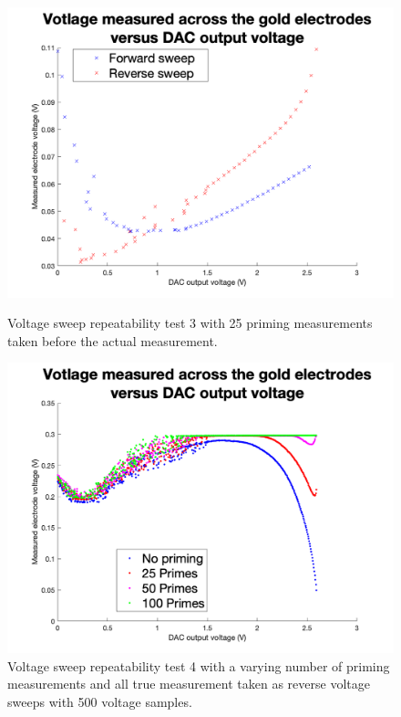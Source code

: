 \begin{figure}[ht]
    \begin{minipage}{0.5\textwidth}
        \centering
        \includegraphics[width=\textwidth]{Figures/Testing/Aus5}
        \caption{Voltage sweep repeatability test 3 with 25 priming measurements taken before the actual measurement.}
        \label{fig:test3} %
    \end{minipage}
    \begin{minipage}{0.5\textwidth}
        \centering
        \includegraphics[width=\textwidth]{Figures/Testing/Aus7}
        \caption{Voltage sweep repeatability test 4 with a varying number of priming measurements and all true measurement taken as reverse voltage sweeps with 500 voltage samples.}
        \label{fig:test4} %
    \end{minipage}
\end{figure}

